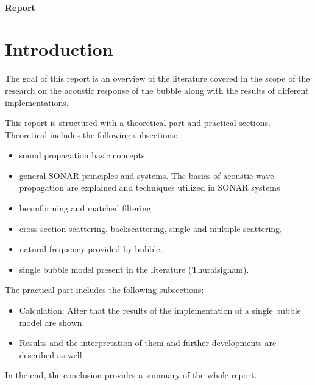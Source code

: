 \documentclass[11pt]{article}
\begin{document}
\thispagestyle{empty}

\begin{center}
{\large{}}   \\
{\large{}}   

{\Large\textbf{Report \\ }}   

 {\Large{}} 

{\large{}}   
\end{center}

\tableofcontents

\section{Introduction}


The goal of this report is an overview of the literature covered in the scope of the research on the acoustic response of the bubble along with the results of different implementations.

This report is structured with a theoretical part and practical sections. Theoretical includes the following subsections:
\begin{itemize}
	\item sound propagation basic concepts
	\item general SONAR principles and systems. The basics of acoustic wave propagation are explained and techniques utilized in SONAR systems
	\item beamforming and matched filtering
	\item cross-section scattering, backscattering, single and multiple scattering, 
	\item natural frequency provided by bubble, 
	\item single bubble model present in the literature (Thuraisigham).  
\end{itemize}
The practical part includes the following subsections:
\begin{itemize}
	\item Calculation: After that the results of the implementation of a single bubble model are shown. 
	\item Results and the interpretation of them and further developments are described as well. 
\end{itemize}
In the end, the conclusion provides a summary of the whole report.
\end{document}
